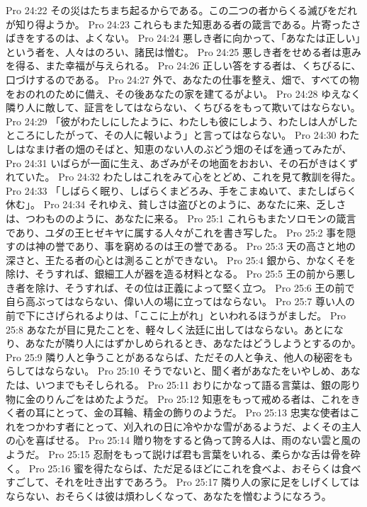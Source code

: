 Pro 24:22  その災はたちまち起るからである。この二つの者からくる滅びをだれが知り得ようか。
Pro 24:23  これらもまた知恵ある者の箴言である。片寄ったさばきをするのは、よくない。
Pro 24:24  悪しき者に向かって、「あなたは正しい」という者を、人々はのろい、諸民は憎む。
Pro 24:25  悪しき者をせめる者は恵みを得る、また幸福が与えられる。
Pro 24:26  正しい答をする者は、くちびるに、口づけするのである。
Pro 24:27  外で、あなたの仕事を整え、畑で、すべての物をおのれのために備え、その後あなたの家を建てるがよい。
Pro 24:28  ゆえなく隣り人に敵して、証言をしてはならない、くちびるをもって欺いてはならない。
Pro 24:29  「彼がわたしにしたように、わたしも彼にしよう、わたしは人がしたところにしたがって、その人に報いよう」と言ってはならない。
Pro 24:30  わたしはなまけ者の畑のそばと、知恵のない人のぶどう畑のそばを通ってみたが、
Pro 24:31  いばらが一面に生え、あざみがその地面をおおい、その石がきはくずれていた。
Pro 24:32  わたしはこれをみて心をとどめ、これを見て教訓を得た。
Pro 24:33  「しばらく眠り、しばらくまどろみ、手をこまぬいて、またしばらく休む」。
Pro 24:34  それゆえ、貧しさは盗びとのように、あなたに来、乏しさは、つわもののように、あなたに来る。
Pro 25:1  これらもまたソロモンの箴言であり、ユダの王ヒゼキヤに属する人々がこれを書き写した。
Pro 25:2  事を隠すのは神の誉であり、事を窮めるのは王の誉である。
Pro 25:3  天の高さと地の深さと、王たる者の心とは測ることができない。
Pro 25:4  銀から、かなくそを除け、そうすれば、銀細工人が器を造る材料となる。
Pro 25:5  王の前から悪しき者を除け、そうすれば、その位は正義によって堅く立つ。
Pro 25:6  王の前で自ら高ぶってはならない、偉い人の場に立ってはならない。
Pro 25:7  尊い人の前で下にさげられるよりは、「ここに上がれ」といわれるほうがましだ。
Pro 25:8  あなたが目に見たことを、軽々しく法廷に出してはならない。あとになり、あなたが隣り人にはずかしめられるとき、あなたはどうしようとするのか。
Pro 25:9  隣り人と争うことがあるならば、ただその人と争え、他人の秘密をもらしてはならない。
Pro 25:10  そうでないと、聞く者があなたをいやしめ、あなたは、いつまでもそしられる。
Pro 25:11  おりにかなって語る言葉は、銀の彫り物に金のりんごをはめたようだ。
Pro 25:12  知恵をもって戒める者は、これをきく者の耳にとって、金の耳輪、精金の飾りのようだ。
Pro 25:13  忠実な使者はこれをつかわす者にとって、刈入れの日に冷やかな雪があるようだ、よくその主人の心を喜ばせる。
Pro 25:14  贈り物をすると偽って誇る人は、雨のない雲と風のようだ。
Pro 25:15  忍耐をもって説けば君も言葉をいれる、柔らかな舌は骨を砕く。
Pro 25:16  蜜を得たならば、ただ足るほどにこれを食べよ、おそらくは食べすごして、それを吐き出すであろう。
Pro 25:17  隣り人の家に足をしげくしてはならない、おそらくは彼は煩わしくなって、あなたを憎むようになろう。
